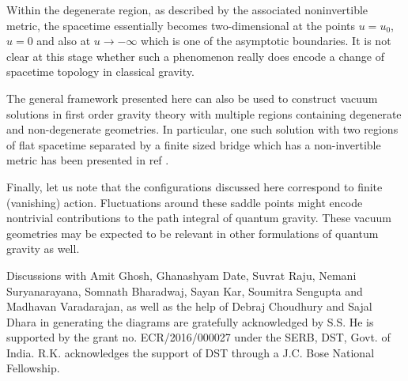\documentclass[preprint,aps,superscriptaddress,nofootinbib]{revtex4-1}
\begin{document}
Within the degenerate region, as described by the associated noninvertible metric, the spacetime essentially becomes two-dimensional at the points $u=u_0$, $u=0$ and also at $u\rightarrow -\infty$ which is one of the asymptotic boundaries. It is not clear at this stage whether such a phenomenon really does encode a change of spacetime topology in classical gravity.

The general framework presented here can also be used to construct vacuum
solutions in first order gravity theory with multiple regions containing
degenerate and non-degenerate geometries. In particular, one such
solution with two regions of flat spacetime separated by a finite
sized bridge which has a non-invertible metric has been presented
in ref \cite{sandipan}.

Finally, let us note that the configurations discussed here 
correspond to finite (vanishing) action.   
Fluctuations around these saddle points might encode nontrivial 
contributions to the path integral of quantum gravity. These 
vacuum geometries may be expected to be relevant in other 
formulations of quantum gravity as well. 

\acknowledgments
Discussions with Amit Ghosh, Ghanashyam Date, Suvrat Raju, Nemani Suryanarayana, Somnath Bharadwaj, Sayan Kar, Soumitra Sengupta and Madhavan Varadarajan, as well as the help of Debraj Choudhury and Sajal Dhara in generating the diagrams are gratefully acknowledged by S.S. He is supported by the grant no. ECR/2016/000027 under the SERB, DST, Govt. of India. R.K. acknowledges the support of DST 
through a J.C. Bose National Fellowship.
\end{document}
